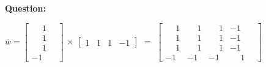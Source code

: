 \documentclass[12pt]{article}
\begin{document}
\textbf{Question: } \newline

	$
	\overline{w} =
	\begin{bmatrix}
		\phantom{-}1\quad  \\
		\phantom{-}1\quad \\
		\phantom{-}1\quad  \\
		 -1\quad
	\end{bmatrix}$
	$\times$
	$\begin{bmatrix}
			1 & 1 & 1 & -1
	\end{bmatrix}$
	$ = $
	$\begin{bmatrix}
		\phantom{-}1 & 	\phantom{-}1 & 	\phantom{-}1 & -1 \quad\\
		\phantom{-}1 & 	\phantom{-}1 &	\phantom{-} 1 & -1 \quad \\
		\phantom{-}	1 & \phantom{-}1 &	\phantom{-} 1 & -1 \quad\\
		-1 & -1 & -1 & 	\phantom{-}1 \quad
	\end{bmatrix}$\newline\newline
\end{document}
